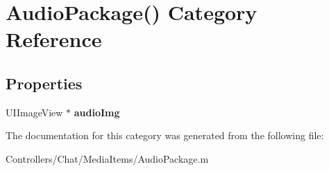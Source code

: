 \hypertarget{category_audio_package_07_08}{}\section{Audio\+Package() Category Reference}
\label{category_audio_package_07_08}
\subsection*{Properties}
\begin{DoxyCompactItemize}
\item 
\hypertarget{category_audio_package_07_08_afa86c9c2572f19d5183c18856ddd66da}{}U\+I\+Image\+View $\ast$ {\bfseries audio\+Img}\label{category_audio_package_07_08_afa86c9c2572f19d5183c18856ddd66da}

\end{DoxyCompactItemize}


The documentation for this category was generated from the following file\+:\begin{DoxyCompactItemize}
\item 
Controllers/\+Chat/\+Media\+Items/Audio\+Package.\+m\end{DoxyCompactItemize}
